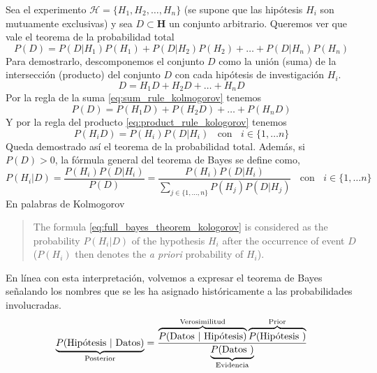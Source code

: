\documentclass[a4paper,11pt]{book}
\theoremstyle{definition}
\begin{document}
Sea el experimento $\mathcal{H}= \{ H_1, H_2, \dots, H_n \}$ (se supone que las hip\'otesis $H_i$ son mutuamente exclusivas) y sea $D \subset \textbf{H}$ un conjunto arbitrario.
%
Queremos ver que vale el teorema de la probabilidad total
%
\begin{equation}
P(D) = P(D|H_1)P(H_1) + P(D|H_2)P(H_2) + \dots + P(D|H_n)P(H_n)
\end{equation}
%
Para demostrarlo, descomponemos el conjunto $D$ como la unión (suma) de la intersección (producto) del conjunto $D$ con cada hipótesis de investigación $H_i$.
%
\begin{equation*}
D = H_1D + H_2D + \dots + H_nD
\end{equation*}
%
Por la regla de la suma \eqref{eq:sum_rule_kolmogorov} tenemos
%
\begin{equation*}
P(D) = P(H_1D) + P(H_2D) + \dots + P(H_nD)
\end{equation*}
%
Y por la regla del producto \eqref{eq:product_rule_kologorov} tenemos
%
\begin{equation*}
P(H_i D ) = P(H_i) P(D|H_i) \ \ \ \ \text{con} \ \ \ \ i \in \{1,\dots n\}
\end{equation*}
%
Queda demostrado as\'i el teorema de la probabilidad total.
%
Adem\'as, si $P(D)>0$, la f\'ormula general del teorema de Bayes se define como,
%
\begin{equation} \label{eq:full_bayes_theorem_kologorov}
P(H_i|D) = \frac{P(H_i) P(D|H_i)}{P(D)} = \frac{P(H_i) P(D|H_i)}{\sum_{j \in \{1, \dots, n \} } P(H_j) P(D|H_j) } \ \ \ \ \text{con} \ \ \ \ i \in \{1,\dots n\}
\end{equation}
%
En palabras de Kolmogorov
%
\begin{quotation}
The formula \eqref{eq:full_bayes_theorem_kologorov} is considered as the probability $P(H_i|D)$ of the hypothesis $H_i$ after the occurrence of event $D$ ($P(H_i)$ then denotes the \emph{a priori} probability of $H_i$).
\end{quotation}
%
En l\'inea con esta interpretaci\'on, volvemos a expresar el teorema de Bayes se\~nalando los nombres que se les ha asignado históricamente a las probabilidades involucradas.
%
\begin{equation}\label{eq:teorema_bayes}
\underbrace{P(\text{Hip\'otesis }|\text{ Datos})}_{\text{\scriptsize Posterior}} = \frac{\overbrace{P(\text{Datos }|\text{ Hip\'otesis})}^{\text{\scriptsize Verosimilitud}} \overbrace{P(\text{Hip\'otesis })}^{\text{\scriptsize Prior}} }{\underbrace{P(\text{Datos })}_{\text{\scriptsize Evidencia}}}
\end{equation}
\end{document}
